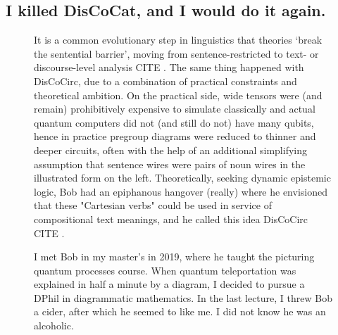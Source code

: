 \subsection{I killed DisCoCat, and I would do it again.}

\begin{figure}[h!]
\centering
{}
\caption{It is a common evolutionary step in linguistics that theories `break the sentential barrier', moving from sentence-restricted to text- or discourse-level analysis \bR CITE \e. The same thing happened with DisCoCirc, due to a combination of practical constraints and theoretical ambition. On the practical side, wide tensors were (and remain) prohibitively expensive to simulate classically and actual quantum computers did not (and still do not) have many qubits, hence in practice pregroup diagrams were reduced to thinner and deeper circuits, often with the help of an additional simplifying assumption that sentence wires were pairs of noun wires in the illustrated form on the left. Theoretically, seeking dynamic epistemic logic, Bob had an epiphanous hangover (really) where he envisioned that these "Cartesian verbs" could be used in service of compositional text meanings, and he called this idea DisCoCirc \bR CITE \e.}
\end{figure}

\begin{figure}[h!]
\centering
{}
\caption{I met Bob in my master's in 2019, where he taught the picturing quantum processes course. When quantum teleportation was explained in half a minute by a diagram, I decided to pursue a DPhil in diagrammatic mathematics. In the last lecture, I threw Bob a cider, after which he seemed to like me. I did not know he was an alcoholic.}
\end{figure}
\clearpage

